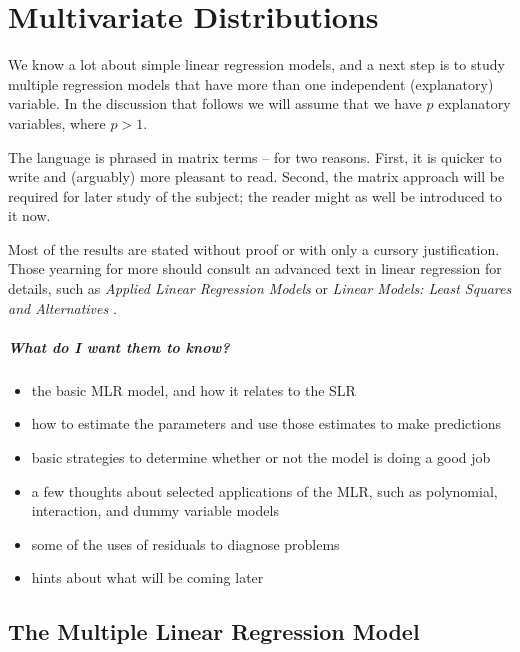 \documentclass[captions=tableheading]{scrbook}
\begin{document}
\chapter{Multivariate Distributions}
\label{sec-7}

\label{cha:Multivariable-Distributions}

\noindent We know a lot about simple linear regression models, and a next step is to study multiple regression models that have more than one independent (explanatory) variable. In the discussion that follows we will assume that we have \(p\) explanatory variables, where \(p>1\).

The language is phrased in matrix terms -- for two reasons. First, it is quicker to write and (arguably) more pleasant to read. Second, the matrix approach will be required for later study of the subject; the reader might as well be introduced to it now.

Most of the results are stated without proof or with only a cursory justification. Those yearning for more should consult an advanced text in linear regression for details, such as \emph{Applied Linear Regression Models} \cite{Neter1996} or \emph{Linear Models: Least Squares and Alternatives} \cite{Rao1999}.


\paragraph*{What do I want them to know?}

\begin{itemize}
\item the basic MLR model, and how it relates to the SLR
\item how to estimate the parameters and use those estimates to make predictions
\item basic strategies to determine whether or not the model is doing a good job
\item a few thoughts about selected applications of the MLR, such as polynomial, interaction, and dummy variable models
\item some of the uses of residuals to diagnose problems
\item hints about what will be coming later
\end{itemize}
\section{The Multiple Linear Regression Model}
\label{sec-7-1}
\end{document}
